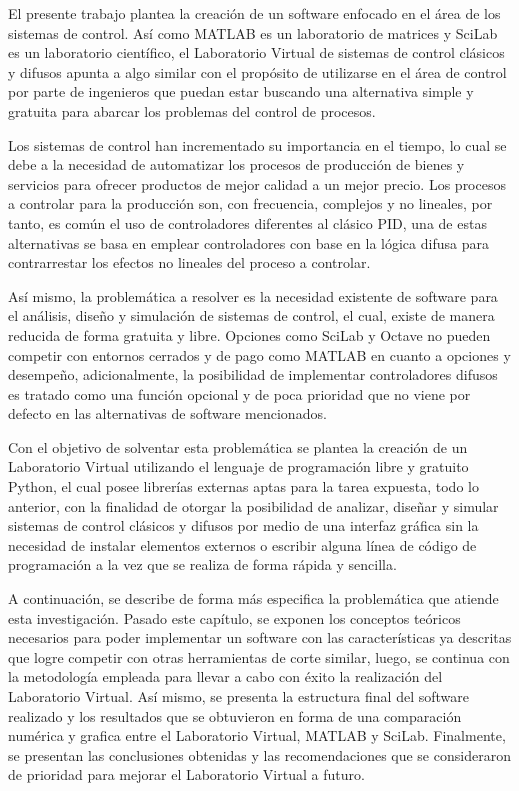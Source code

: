 
El presente trabajo plantea la creación de un software enfocado en el área de los sistemas de control. Así como MATLAB es un laboratorio de matrices y SciLab es un laboratorio científico, el Laboratorio Virtual de sistemas de control clásicos y difusos apunta a algo similar con el propósito de utilizarse en el área de control por parte de ingenieros que puedan estar buscando una alternativa simple y gratuita para abarcar los problemas del control de procesos.

Los sistemas de control han incrementado su importancia en el tiempo, lo cual se debe a la necesidad de automatizar los procesos de producción de bienes y servicios para ofrecer productos de mejor calidad a un mejor precio. Los procesos a controlar para la producción son, con frecuencia, complejos y no lineales, por tanto, es común el uso de controladores diferentes al clásico PID, una de estas alternativas se basa en emplear controladores con base en la lógica difusa para contrarrestar los efectos no lineales del proceso a controlar.

Así mismo, la problemática a resolver es la necesidad existente de software para el análisis, diseño y simulación de sistemas de control, el cual, existe de manera reducida de forma gratuita y libre. Opciones como SciLab y Octave no pueden competir con entornos cerrados y de pago como MATLAB en cuanto a opciones y desempeño, adicionalmente, la posibilidad de implementar controladores difusos es tratado como una función opcional y de poca prioridad que no viene por defecto en las alternativas de software mencionados.

Con el objetivo de solventar esta problemática se plantea la creación de un Laboratorio Virtual utilizando el lenguaje de programación libre y gratuito Python, el cual posee librerías externas aptas para la tarea expuesta, todo lo anterior, con la finalidad de otorgar la posibilidad de analizar, diseñar y simular sistemas de control clásicos y difusos por medio de una interfaz gráfica sin la necesidad de instalar elementos externos o escribir alguna línea de código de programación a la vez que se realiza de forma rápida y sencilla.

A continuación, se describe de forma más especifica la problemática que atiende esta investigación. Pasado este capítulo, se exponen los conceptos teóricos necesarios para poder implementar un software con las características ya descritas que logre competir con otras herramientas de corte similar, luego, se continua con la metodología empleada para llevar a cabo con éxito la realización del Laboratorio Virtual.  Así mismo, se presenta la estructura final del software realizado y los resultados que se obtuvieron en forma de una comparación numérica y grafica entre el Laboratorio Virtual, MATLAB y SciLab. Finalmente, se presentan las conclusiones obtenidas y las recomendaciones que se consideraron de prioridad para mejorar el Laboratorio Virtual a futuro.